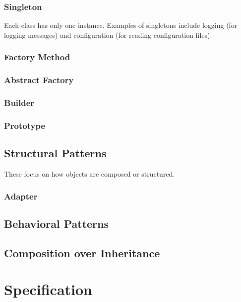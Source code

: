 \documentclass[oneside,11pt,dvipsnames]{book}
\begin{document}
\subsection{Singleton}
Each class has only one instance. Examples of singletons include logging (for logging messages) and configuration (for reading configuration files). 



\subsection{Factory Method}





\subsection{Abstract Factory}

\subsection{Builder}

\subsection{Prototype}

\section{Structural Patterns}
These focus on how objects are composed or structured.

\subsection{Adapter}


\section{Behavioral Patterns}

\section{Composition over Inheritance}

\chapter{Specification}
\end{document}
